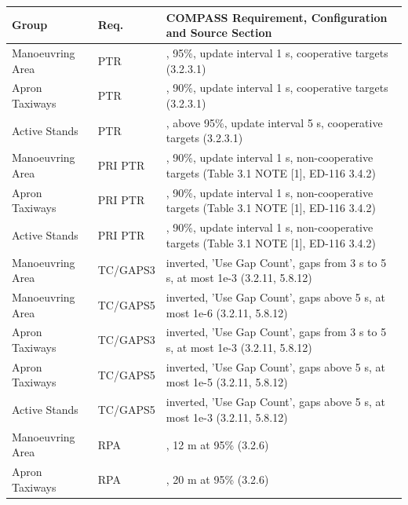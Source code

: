 \begin{center}
 \begin{table}[H]
  \begin{tabularx}{\textwidth}{ | l | l | X | }
    \hline
    \textbf{Group} & \textbf{Req.} & \textbf{COMPASS Requirement, Configuration and Source Section} \\ \hline
    Manoeuvring Area & PTR & \nameref{sec:eval_req_detection}, 95\%, update interval 1 s, cooperative targets (3.2.3.1) \\ \hline
    Apron Taxiways & PTR & \nameref{sec:eval_req_detection}, 90\%, update interval 1 s, cooperative targets (3.2.3.1) \\ \hline
    Active Stands & PTR & \nameref{sec:eval_req_detection}, above 95\%, update interval 5 s, cooperative targets (3.2.3.1) \\ \hline
    Manoeuvring Area & PRI PTR & \nameref{sec:eval_req_detection}, 90\%, update interval 1 s, non-cooperative targets (Table 3.1 NOTE [1], ED-116 3.4.2) \\ \hline
    Apron Taxiways & PRI PTR & \nameref{sec:eval_req_detection}, 90\%, update interval 1 s, non-cooperative targets (Table 3.1 NOTE [1], ED-116 3.4.2) \\ \hline
    Active Stands & PRI PTR & \nameref{sec:eval_req_detection}, 90\%, update interval 1 s, non-cooperative targets (Table 3.1 NOTE [1], ED-116 3.4.2) \\ \hline
    Manoeuvring Area & TC/GAPS3 & \nameref{sec:eval_req_detection} inverted, 'Use Gap Count', gaps from 3 s to 5 s, at most 1e-3 (3.2.11, 5.8.12) \\ \hline
    Manoeuvring Area & TC/GAPS5 & \nameref{sec:eval_req_detection} inverted, 'Use Gap Count', gaps above 5 s, at most 1e-6 (3.2.11, 5.8.12) \\ \hline
    Apron Taxiways & TC/GAPS3 & \nameref{sec:eval_req_detection} inverted, 'Use Gap Count', gaps from 3 s to 5 s, at most 1e-3 (3.2.11, 5.8.12) \\ \hline
    Apron Taxiways & TC/GAPS5 & \nameref{sec:eval_req_detection} inverted, 'Use Gap Count', gaps above 5 s, at most 1e-5 (3.2.11, 5.8.12) \\ \hline
    Active Stands & TC/GAPS5 & \nameref{sec:eval_req_detection} inverted, 'Use Gap Count', gaps above 5 s, at most 1e-3 (3.2.11, 5.8.12) \\ \hline
    Manoeuvring Area & RPA & \nameref{sec:eval_req_pos_distance}, 12 m at 95\% (3.2.6) \\ \hline
    Apron Taxiways & RPA & \nameref{sec:eval_req_pos_distance}, 20 m at 95\% (3.2.6) \\ \hline

\end{tabularx}
\end{table}
\end{center}
